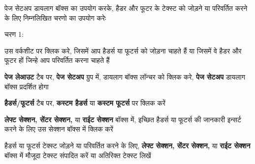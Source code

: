 पेज सेटअप डायलाग बॉक्स का उपयोग करके, हैडर और फूटर के टेक्स्ट को जोड़ने या परिवर्तित करने के लिए निम्नलिखित चरणो का उपयोग करेः
		
\begin{descriptionSimple}{चरण 1:}
\item[चरण 1] उस वर्कशीट पर क्लिक करे, जिसमें आप हैडर्स या फूटर्स को जोड़ना चाहते हैं या जिसमें वे हैडर और फूटर हों जिन्हे आप परिवर्तित करना चाहते हैं
\item[चरण 2] \textbf{पेज लेआउट} टैब पर, \textbf{पेज सेटअप} ग्रुप में, डायलाग बॉक्स लॉन्चर को क्लिक करे, \textbf{पेज सेटअप} डायलाग बॉक्स प्रदर्शित होगा
\item[चरण 3] \textbf{हैडर्स/फूटर्स} टैब पर, \textbf{कस्टम हैडर्स} या \textbf{कस्टम फूटर्स} पर क्लिक करें 
\item[चरण 4] \textbf{लेफ्ट सेक्शन, सेंटर सेक्शन,} या \textbf{राईट सेक्शन} बॉक्स में, इच्छित हैडर्स या फूटर्स की जानकारी इन्सर्ट करने के लिए उस सेक्शन बॉक्स में क्लिक करें
\item[चरण 5] हैडर्स या फूटर्स टेक्स्ट जोड़ने या परिवर्तित करने के लिए, \textbf{लेफ्ट सेक्शन, सेंटर सेक्शन,} या \textbf{राईट सेक्शन} बॉक्स में मौजूदा टेक्स्ट संपादित करें या अतिरिक्त टेक्स्ट लिखें
\end{descriptionSimple}	
